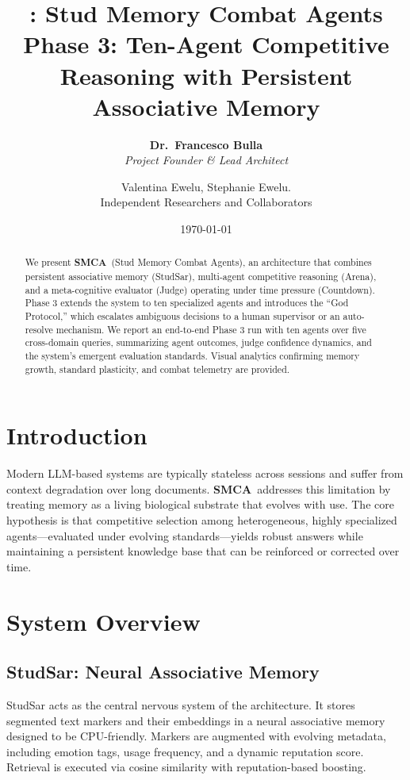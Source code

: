 \documentclass[11pt, a4paper]{article}
\title{\vspace{-2cm}\huge\textbf{\sysname: Stud Memory Combat Agents}\\
\Large\vspace{0.2cm}Phase 3: Ten-Agent Competitive Reasoning with Persistent Associative Memory}
\author{
\textbf{Dr.\ Francesco Bulla}\\
\textit{Project Founder \& Lead Architect}
\and
Valentina Ewelu, Stephanie Ewelu.\\
{\small Independent Researchers and Collaborators}
}
\date{\today}
\newcommand{\sysname}{\textbf{SMCA}}
\begin{document}
\maketitle

\begin{abstract}
\noindent We present \sysname\ (Stud Memory Combat Agents), an architecture that combines persistent associative memory (StudSar), multi-agent competitive reasoning (Arena), and a meta-cognitive evaluator (Judge) operating under time pressure (Countdown). Phase 3 extends the system to ten specialized agents and introduces the ``God Protocol,'' which escalates ambiguous decisions to a human supervisor or an auto-resolve mechanism. We report an end-to-end Phase 3 run with ten agents over five cross-domain queries, summarizing agent outcomes, judge confidence dynamics, and the system's emergent evaluation standards. Visual analytics confirming memory growth, standard plasticity, and combat telemetry are provided.
\end{abstract}

\section{Introduction}
Modern LLM-based systems are typically stateless across sessions and suffer from context degradation over long documents. \sysname\ addresses this limitation by treating memory as a living biological substrate that evolves with use. The core hypothesis is that competitive selection among heterogeneous, highly specialized agents—evaluated under evolving standards—yields robust answers while maintaining a persistent knowledge base that can be reinforced or corrected over time.

\section{System Overview}

\subsection{StudSar: Neural Associative Memory}
StudSar acts as the central nervous system of the architecture. It stores segmented text markers and their embeddings in a neural associative memory designed to be CPU-friendly. Markers are augmented with evolving metadata, including emotion tags, usage frequency, and a dynamic reputation score. Retrieval is executed via cosine similarity with reputation-based boosting.
\end{document}
